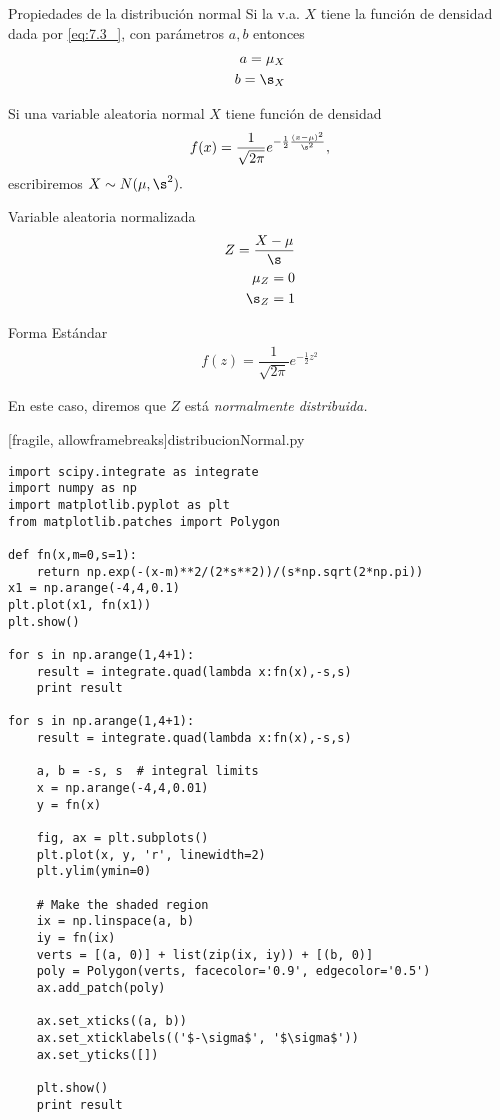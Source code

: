 {Propiedades de la distribución normal}
 Si la v.a. $X$ tiene la función de densidad dada por \eqref{eq:7.3_}, con parámetros $a,b$ entonces
 \begin{align}
  a = \mu_{X}\\
  b = \s_{X}
 \end{align}



 Si una variable aleatoria normal $X$ tiene función de densidad
  \begin{align}
  \label{eq:7.3_}
  f(x)=\dfrac{1}{\sqrt{2\pi}}e^{-\frac{1}{2}\frac{(x-\mu)^{2}}{\s^{2}}},
 \end{align}
 escribiremos $X\sim N(\mu, \s^{2}).$


{Variable aleatoria normalizada}
 \begin{align}
  \label{van}
  Z = \dfrac{X-\mu}{\s}\\
  \mu_{Z}=0 \\
  \s_{Z}=1
 \end{align}


{Forma Estándar}
 \begin{align}
  \label{eq:7.4}
  f(z)=\dfrac{1}{\sqrt{2\pi}}e^{-\frac{1}{2}z^{2}}
 \end{align}


En este caso, diremos que $Z$ está \emph{normalmente distribuida.}


[fragile, allowframebreaks]{distribucionNormal.py}
 \begin{verbatim}
import scipy.integrate as integrate
import numpy as np
import matplotlib.pyplot as plt
from matplotlib.patches import Polygon

def fn(x,m=0,s=1):
    return np.exp(-(x-m)**2/(2*s**2))/(s*np.sqrt(2*np.pi))
x1 = np.arange(-4,4,0.1)
plt.plot(x1, fn(x1))
plt.show()

for s in np.arange(1,4+1):
    result = integrate.quad(lambda x:fn(x),-s,s)
    print result

for s in np.arange(1,4+1):
    result = integrate.quad(lambda x:fn(x),-s,s)

    a, b = -s, s  # integral limits
    x = np.arange(-4,4,0.01)
    y = fn(x)

    fig, ax = plt.subplots()
    plt.plot(x, y, 'r', linewidth=2)
    plt.ylim(ymin=0)

    # Make the shaded region
    ix = np.linspace(a, b)
    iy = fn(ix)
    verts = [(a, 0)] + list(zip(ix, iy)) + [(b, 0)]
    poly = Polygon(verts, facecolor='0.9', edgecolor='0.5')
    ax.add_patch(poly)

    ax.set_xticks((a, b))
    ax.set_xticklabels(('$-\sigma$', '$\sigma$'))
    ax.set_yticks([])

    plt.show()
    print result
 \end{verbatim}


